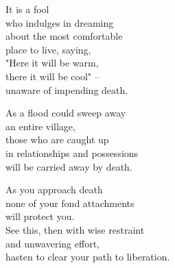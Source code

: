 It is a fool\\
who indulges in dreaming\\
about the most comfortable\\
place to live, saying,\\
"Here it will be warm,\\
there it will be cool" --\\
unaware of impending death.


As a flood could sweep away\\
an entire village,\\
those who are caught up\\
in relationships and possessions\\
will be carried away by death.


As you approach death\\
none of your fond attachments\\
will protect you.\\
See this, then with wise restraint\\
and unwavering effort,\\
hasten to clear your path to liberation.

